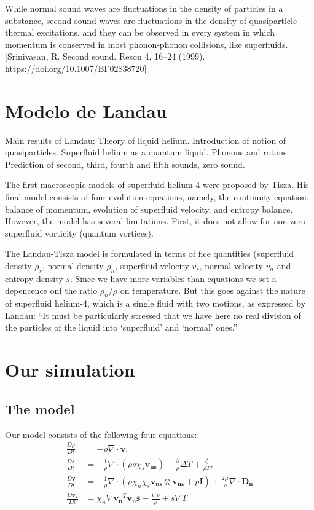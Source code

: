 \documentclass{article}
\begin{document}
While normal sound waves are fluctuations in the density of particles in a substance, second sound waves are fluctuations in the density of quasiparticle thermal excitations, and they can be observed in every system in which momentum is conserved in most phonon-phonon collisions, like superfluids. [Srinivasan, R. Second sound. Reson 4, 16–24 (1999). https://doi.org/10.1007/BF02838720]



\section{Modelo de Landau}
\cite{Kincl}
Main results of Landau:
Theory of liquid helium. Introduction of notion of quasiparticles. Superfluid
helium as a quantum liquid. Phonons and rotons. Prediction of second, third,
fourth and fifth sounds, zero sound.

\cite{PhysRev.60.356}

The first macroscopic models of superfluid helium-4 were
proposed by Tisza. His final model consists of four evolution equations, namely, the continuity equation, balance of momentum, evolution of superfluid velocity, and entropy balance. However, the model has several limitations. First, it does not allow for non-zero superfluid vorticity (quantum vortices). 

The Landau-Tisza model is formulated in terms of fice quantities (superfluid density $\rho_s$, normal density $\rho_n$, superfluid velocity $v_s$, normal velocity $v_n$ and entropy density $s$. Since we have more variables than equations we set a depencence onf the ratio $\rho_n/\rho$ on temperature. But this goes against the nature of superfluid helium-4, which is a single fluid with two motions, as expressed by Landau: “It must be particularly stressed that we
have here no real division of the particles of the liquid into ‘superfluid’
and ‘normal’ ones.”


\section{Our simulation}
\subsection{The model}
Our model consists of the following four equations:
\begin{align}
\frac{D\rho}{Dt} &= -\rho \nabla \cdot \mathbf{v}, \\
\frac{Ds}{Dt} &= -\frac{1}{\rho} \nabla \cdot (\rho s \chi_s \mathbf{v_{ns}}) + \frac{\beta}{\rho} \Delta T + \frac{\zeta}{\rho T} ,\\
\frac{D\mathbf{v}}{Dt} &= -\frac{1}{\rho} \nabla \cdot (\rho \chi_n \chi_s \mathbf{v_{ns}} \otimes \mathbf{v_{ns}} + p \mathbf{I}) + \frac{2 \mu}{\rho} \nabla \cdot \mathbf{D_n} \\
\frac{D\mathbf{v_s}}{Dt} &= \chi_n \nabla \mathbf{v_n}^T \mathbf{v_ns} - \frac{\nabla p}{\rho} + s \nabla T
\end{align}
\end{document}
